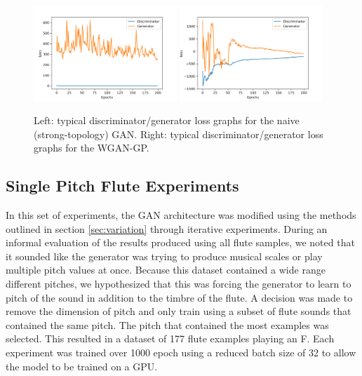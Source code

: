 \begin{figure}
\centering
\includegraphics[width=0.48\textwidth]{0725_flute_dcgan_loss.png}
\includegraphics[width=0.48\textwidth]{0725_flute_wpgan_loss.png}
\caption{Left: typical discriminator/generator loss graphs for the naive (strong-topology) GAN. Right: typical discriminator/generator loss graphs for the WGAN-GP.}
\end{figure}\label{dcgan_wpgan}

\subsection{Single Pitch Flute Experiments}
\label{sec:single_pitch_experiments}
In this set of experiments, the GAN architecture was modified using the methods outlined in section \ref{sec:variation} through iterative experiments. During an informal evaluation of the results produced using all flute samples, we noted that it sounded like the generator was trying to produce musical scales or play multiple pitch values at once. Because this dataset contained a wide range different pitches, we hypothesized that this was forcing the generator to learn to pitch of the sound in addition to the timbre of the flute. A decision was made to remove the dimension of pitch and only train using a subset of flute sounds that contained the same pitch. The pitch that contained the most examples was selected. This resulted in a dataset of 177 flute examples playing an F. Each experiment was trained over 1000 epoch using a reduced batch size of 32 to allow the model to be trained on a GPU.

